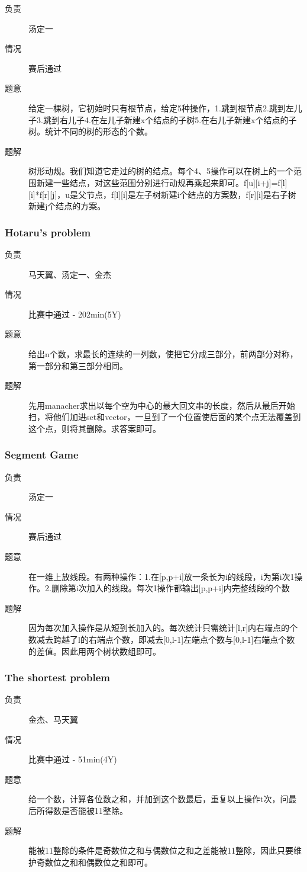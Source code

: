 \documentclass[a4paper, 11pt, nofonts, nocap, fancyhdr]{ctexart}
\newcommand{\problem}[1]{\subsubsection{#1}}
\begin{document}
\begin{description}
\item[负责] 汤定一
\item[情况] 赛后通过
\item[题意]
给定一棵树，它初始时只有根节点，给定5种操作，1.跳到根节点2.跳到左儿子3.跳到右儿子4.在左儿子新建x个结点的子树5.在右儿子新建x个结点的子树。统计不同的树的形态的个数。
\item[题解]
树形动规。我们知道它走过的树的结点。每个4、5操作可以在树上的一个范围新建一些结点，对这些范围分别进行动规再乘起来即可。f[u][i+j]=f[l][i]*f[r][j]，u是父节点，f[l][i]是左子树新建i个结点的方案数，f[r][i]是右子树新建j个结点的方案。
\end{description}

\problem{Hotaru's problem}

\begin{description}
\item[负责] 马天翼、汤定一、金杰
\item[情况] 比赛中通过 - 202min(5Y)
\item[题意]
给出n个数，求最长的连续的一列数，使把它分成三部分，前两部分对称，第一部分和第三部分相同。
\item[题解]
先用manacher求出以每个空为中心的最大回文串的长度，然后从最后开始扫，将他们加进set和vector，一旦到了一个位置使后面的某个点无法覆盖到这个点，则将其删除。求答案即可。
\end{description}

\problem{Segment Game}

\begin{description}
\item[负责] 汤定一
\item[情况] 赛后通过
\item[题意]
在一维上放线段。有两种操作：1.在[p,p+i]放一条长为i的线段，i为第i次1操作。2.删除第i次加入的线段。每次1操作都输出[p,p+i]内完整线段的个数
\item[题解]
因为每次加入操作是从短到长加入的。每次统计只需统计[l,r]内右端点的个数减去跨越了l的右端点个数，即减去[0,l-1]左端点个数与[0,l-1]右端点个数的差值。因此用两个树状数组即可。
\end{description}

\problem{The shortest problem}

\begin{description}
\item[负责] 金杰、马天翼
\item[情况] 比赛中通过 - 51min(4Y)
\item[题意]
给一个数，计算各位数之和，并加到这个数最后，重复以上操作t次，问最后所得数是否能被11整除。
\item[题解]
能被11整除的条件是奇数位之和与偶数位之和之差能被11整除，因此只要维护奇数位之和和偶数位之和即可。
\end{description}
\end{document}
